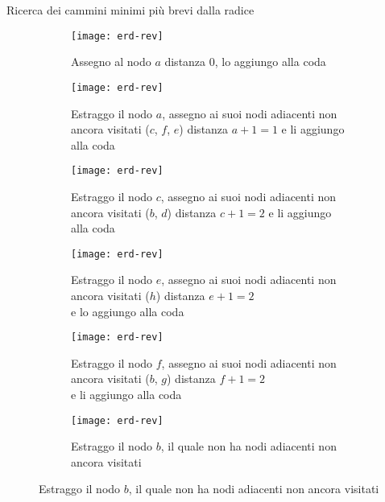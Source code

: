 \begin{algorithm}[ht]
	\caption{Ricerca dei cammini minimi più brevi dalla radice}
	
\end{algorithm}

\clearpage
\begin{figure}[H]

	\begin{subfigure}[t]{.48\textwidth}
		\texttt{[image: erd-rev]}
		\caption{Assegno al nodo \(a\) distanza \(0\), lo aggiungo alla coda}
	\end{subfigure}\hfill
	\begin{subfigure}[t]{.48\textwidth}
		\texttt{[image: erd-rev]}
		\caption{Estraggo il nodo \(a\),
			assegno ai suoi nodi adiacenti non ancora visitati (\(c\), \(f\), \(e\)) distanza \(a+1 = 1\)
			e li aggiungo alla coda}
	\end{subfigure}

	\begin{subfigure}[t]{.48\textwidth}
		\texttt{[image: erd-rev]}
		\caption{Estraggo il nodo \(c\),
			assegno ai suoi nodi adiacenti non ancora visitati (\(b\), \(d\)) distanza \(c+1 = 2\)
			e li aggiungo alla coda}
	\end{subfigure}\hfill
	\begin{subfigure}[t]{.48\textwidth}
		\texttt{[image: erd-rev]}
		\caption{Estraggo il nodo \(e\),
			assegno ai suoi nodi adiacenti non ancora visitati (\(h\)) distanza \(e+1 = 2\)\\
			e lo aggiungo alla coda}
	\end{subfigure}

	\begin{subfigure}[t]{.45\textwidth}
		\texttt{[image: erd-rev]}
		\caption{Estraggo il nodo \(f\),
			assegno ai suoi nodi adiacenti non ancora visitati (\(b\), \(g\)) distanza \(f+1 = 2\)\\
			e li aggiungo alla coda}
	\end{subfigure}\hfill
	\begin{subfigure}[t]{.45\textwidth}
		\texttt{[image: erd-rev]}
		\caption{Estraggo il nodo \(b\),
			il quale non ha nodi adiacenti non ancora visitati}
	\end{subfigure}

\end{figure}

